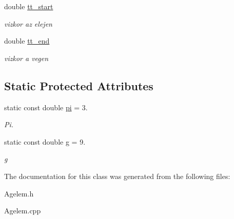 \begin{DoxyCompactItemize}
double \hyperlink{class_agelem_a09ea41e75493961eb2b1d755c74e95f6}{tt\+\_\+start}
\begin{DoxyCompactList}\small\item\em vizkor az elejen \end{DoxyCompactList}\item 
\hypertarget{class_agelem_af07d516eda5f43a676f9f417436e0d9c}{}\label{class_agelem_af07d516eda5f43a676f9f417436e0d9c} 
double \hyperlink{class_agelem_af07d516eda5f43a676f9f417436e0d9c}{tt\+\_\+end}
\begin{DoxyCompactList}\small\item\em vizkor a vegen \end{DoxyCompactList}\end{DoxyCompactItemize}
\subsection*{Static Protected Attributes}
\begin{DoxyCompactItemize}
\item 
\hypertarget{class_agelem_a994d67cc2ee3be36159a774681625134}{}\label{class_agelem_a994d67cc2ee3be36159a774681625134} 
static const double \hyperlink{class_agelem_a994d67cc2ee3be36159a774681625134}{pi} = 3.
\begin{DoxyCompactList}\small\item\em Pi. \end{DoxyCompactList}\item 
\hypertarget{class_agelem_ab382ba1135a9aae3a5fd817f5746be43}{}\label{class_agelem_ab382ba1135a9aae3a5fd817f5746be43} 
static const double \hyperlink{class_agelem_ab382ba1135a9aae3a5fd817f5746be43}{g} = 9.
\begin{DoxyCompactList}\small\item\em g \end{DoxyCompactList}\end{DoxyCompactItemize}


The documentation for this class was generated from the following files\+:\begin{DoxyCompactItemize}
\item 
Agelem.\+h\item 
Agelem.\+cpp\end{DoxyCompactItemize}
